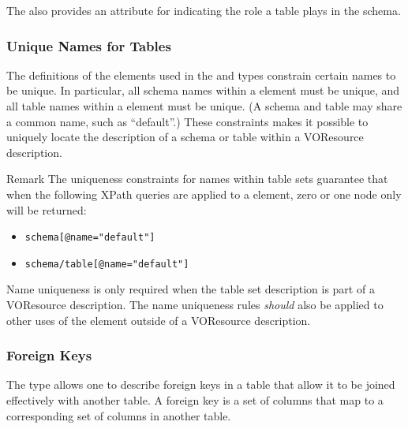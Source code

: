 \documentclass[11pt,a4paper]{ivoa}
\begin{document}
The  also provides an attribute for indicating
the role a table plays in the schema.





\subsubsection{Unique Names for Tables}
\label{sect:unique}


The definitions of the  elements used in
the  and
 types
constrain certain names to be unique.  In particular, all schema names
within a  element must be unique, and all
table names within a  element must be
unique.  (A schema and table may share a common name, such as
``default''.)  These constraints makes it possible to uniquely locate
the description of a schema or table within a VOResource description.  


\begin{admonition}{Remark}
The uniqueness constraints for names
within table sets guarantee that when the following XPath queries are
applied to a  element, zero or one node
only will be returned:

\begin{itemize}
\item\verb|schema[@name="default"]|
\item\verb|schema/table[@name="default"]|
\end{itemize}
\end{admonition}

Name uniqueness is only required when the table set description is
part of a VOResource description.  The name uniqueness rules
\emph{should} also be applied to other uses of the
 element outside of a VOResource
description.  


\subsubsection{Foreign Keys}
\label{sect:fkey}


The  type allows one to describe foreign
keys in a table that allow it to be joined effectively with another
table.  A foreign key is a set of columns that map to a corresponding
set of columns in another table.  
\end{document}

